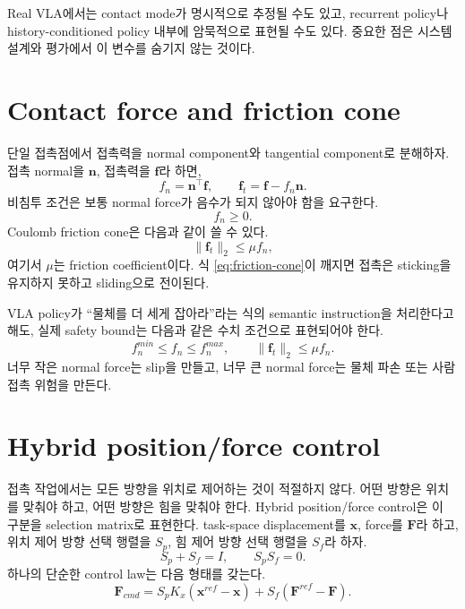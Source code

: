 Real VLA에서는 contact mode가 명시적으로 추정될 수도 있고, recurrent policy나 history-conditioned policy 내부에 암묵적으로 표현될 수도 있다. 중요한 점은 시스템 설계와 평가에서 이 변수를 숨기지 않는 것이다.

\section{Contact force and friction cone}

단일 접촉점에서 접촉력을 normal component와 tangential component로 분해하자. 접촉 normal을 $\bm{n}$, 접촉력을 $\bm{f}$라 하면,
\begin{equation}
  f_n = \bm{n}^{\top}\bm{f},
  \qquad
  \bm{f}_t = \bm{f} - f_n\bm{n}.
  \label{eq:normal-tangent-force}
\end{equation}
비침투 조건은 보통 normal force가 음수가 되지 않아야 함을 요구한다.
\begin{equation}
  f_n \ge 0.
  \label{eq:normal-force-positive}
\end{equation}
Coulomb friction cone은 다음과 같이 쓸 수 있다.
\begin{equation}
  \|\bm{f}_t\|_2 \le \mu f_n,
  \label{eq:friction-cone}
\end{equation}
여기서 $\mu$는 friction coefficient이다. 식 \eqref{eq:friction-cone}이 깨지면 접촉은 sticking을 유지하지 못하고 sliding으로 전이된다.

VLA policy가 ``물체를 더 세게 잡아라''라는 식의 semantic instruction을 처리한다고 해도, 실제 safety bound는 다음과 같은 수치 조건으로 표현되어야 한다.
\begin{equation}
  f_n^{min} \le f_n \le f_n^{max},
  \qquad
  \|\bm{f}_t\|_2 \le \mu f_n.
  \label{eq:grasp-force-bound}
\end{equation}
너무 작은 normal force는 slip을 만들고, 너무 큰 normal force는 물체 파손 또는 사람 접촉 위험을 만든다.

\section{Hybrid position/force control}

접촉 작업에서는 모든 방향을 위치로 제어하는 것이 적절하지 않다. 어떤 방향은 위치를 맞춰야 하고, 어떤 방향은 힘을 맞춰야 한다. Hybrid position/force control은 이 구분을 selection matrix로 표현한다. task-space displacement를 $\bm{x}$, force를 $\bm{F}$라 하고, 위치 제어 방향 선택 행렬을 $S_p$, 힘 제어 방향 선택 행렬을 $S_f$라 하자.
\begin{equation}
  S_p + S_f = I,
  \qquad
  S_pS_f = 0.
  \label{eq:selection-matrices}
\end{equation}
하나의 단순한 control law는 다음 형태를 갖는다.
\begin{equation}
  \bm{F}_{cmd}
  =
  S_p K_x(\bm{x}^{ref}-\bm{x})
  +
  S_f(\bm{F}^{ref}-\bm{F}).
  \label{eq:hybrid-force-position}
\end{equation}

